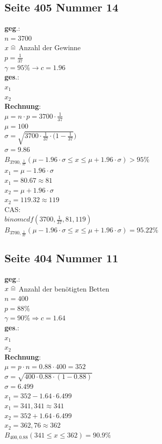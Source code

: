 \documentclass[a4paper,12pt]{article}
\newcommand\equalhat{\mathrel{\stackon[1.5pt]{=}{\stretchto{%
    \scalerel*[\widthof{=}]{\wedge}{\rule{1ex}{3ex}}}{0.5ex}}}}
\begin{document}
\subsection*{Seite 405 Nummer 14}
\textbf{geg}.:\\
$n = 3700$\\
$x \equalhat$ Anzahl der Gewinne\\
$p = \frac{1}{37}$\\
$\gamma = 95\% \rightarrow c = 1.96$\\
\textbf{ges}.:\\
$x_{1}$\\
$x_{2}$\\
\textbf{Rechnung}:\\
$\mu = n \cdot p = 3700 \cdot \frac{1}{37}$\\
$\mu = 100$\\
$\sigma = \sqrt{3700 \cdot \frac{1}{37} \cdot (1 - \frac{1}{37}})$\\
$\sigma = 9.86$\\
$B_{3700, \frac{1}{37}}(\mu - 1.96 \cdot \sigma \leq x \leq \mu + 1.96 \cdot \sigma) > 95 \%$\\
$x_{1} = \mu - 1.96 \cdot \sigma$\\
$x_{1} = 80.67 \approx 81$\\
$x_{2} = \mu + 1.96 \cdot \sigma$\\
$x_{2} = 119.32 \approx 119$\\
CAS:\\
$binomcdf(3700, \frac{1}{37}, 81, 119)$\\
$B_{3700, \frac{1}{37}}(\mu - 1.96 \cdot \sigma \leq x \leq \mu + 1.96 \cdot \sigma) = 95.22 \%$\\
\pagebreak
\subsection*{Seite 404 Nummer 11}
\textbf{geg}.:\\
$x \equalhat$ Anzahl der benötigten Betten\\
$n = 400$\\
$p = 88\%$\\
$\gamma = 90\% \Rightarrow c = 1.64$\\
\textbf{ges}.:\\
$x_{1}$\\
$x_{2}$\\
\textbf{Rechnung}:\\
$\mu = p \cdot n = 0.88 \cdot 400 = 352$\\
$\sigma = \sqrt{400 \cdot 0.88 \cdot (1 - 0.88)}$\\
$\sigma = 6.499$\\
$x_{1} = 352 - 1.64 \cdot 6.499$\\
$x_{1} = 341,341 \approx 341$\\
$x_{2} = 352 + 1.64 \cdot 6.499$\\
$x_{2} = 362,76 \approx 362$\\
$B_{400, 0.88}(341 \leq x \leq 362) = 90.9\%$\\
\pagebreak
\end{document}
